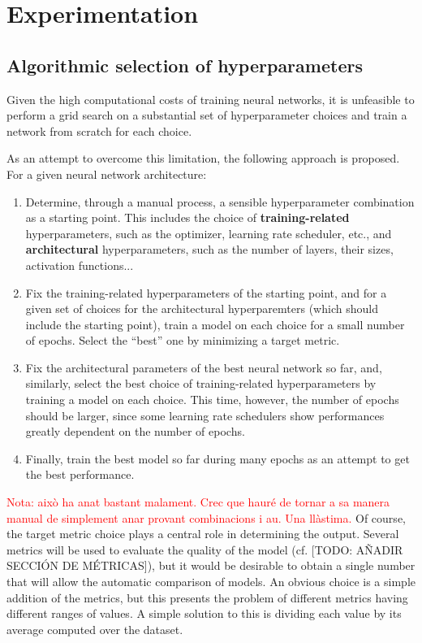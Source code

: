 \documentclass[twocolumn,twoside,a4paper,10pt]{IEEEtran}
\newcommand{\Frank}[1]{\textcolor{red}{#1}}
\begin{document}
\section{Experimentation}
\subsection{Algorithmic selection of hyperparameters}
Given the high computational costs of training neural networks, it is unfeasible to perform a grid search on a substantial set of hyperparameter choices and train a network from scratch for each choice.

As an attempt to overcome this limitation, the following approach is proposed. For a given neural network architecture:
\begin{enumerate}
  \item Determine, through a manual process, a sensible hyperparameter combination as a starting point. This includes the choice of \textbf{training-related} hyperparameters, such as the optimizer, learning rate scheduler, etc., and \textbf{architectural} hyperparameters, such as the number of layers, their sizes, activation functions...
  \item Fix the training-related hyperparameters of the starting point, and for a given set of choices for the architectural hyperparemters (which should include the starting point), train a model on each choice for a small number of epochs. Select the ``best'' one by minimizing a target metric.
  \item Fix the architectural parameters of the best neural network so far, and, similarly, select the best choice of training-related hyperparameters by training a model on each choice. This time, however, the number of epochs should be larger, since some learning rate schedulers show performances greatly dependent on the number of epochs.
  \item Finally, train the best model so far during many epochs as an attempt to get the best performance.
\end{enumerate}
\Frank{Nota: això ha anat bastant malament. Crec que hauré de tornar a sa manera manual de simplement anar provant combinacions i au. Una llàstima.}
Of course, the target metric choice plays a central role in determining the output. Several metrics will be used to evaluate the quality of the model (cf. [TODO: AÑADIR SECCIÓN DE MÉTRICAS]), but it would be desirable to obtain a single number that will allow the automatic comparison of models. An obvious choice is a simple addition of the metrics, but this presents the problem of different metrics having different ranges of values. A simple solution to this
is dividing each value by its average computed over the dataset.
\end{document}
